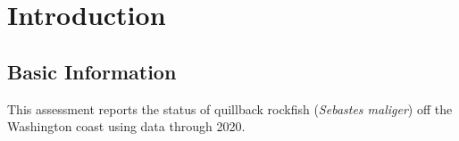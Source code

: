 \documentclass[11pt,
  english,
  a4paper,
]{article}
\begin{document}
\pagestyle{plain}  %
\renewcommand*{\thefootnote}{\arabic{footnote}}  %
\setcounter{footnote}{0}  %
\renewcommand{\headrulewidth}{0.5pt}
\renewcommand{\footrulewidth}{0.5pt}

\newcommand{\lt}{\ensuremath <}
\newcommand{\gt}{\ensuremath >}


\setcounter{page}{1}

\renewcommand{\thetable}{\roman{table}}
\renewcommand{\thefigure}{\roman{figure}}

\setlength\parskip{0.5em plus 0.1em minus 0.2em}

\vspace{500cm}

\pagebreak

\pagebreak
{}
\setcounter{page}{1}
\renewcommand{\thefigure}{\arabic{figure}}
\renewcommand{\thetable}{\arabic{table}}
\setcounter{table}{0}
\setcounter{figure}{0}


\hypertarget{introduction}{%
\section{Introduction}\label{introduction}}

\leavevmode\tagmcend\tagstructend


\hypertarget{basic-information}{%
\subsection{Basic Information}\label{basic-information}}

\leavevmode\tagmcend\tagstructend


This assessment reports the status of quillback rockfish (\emph{Sebastes maliger}) off the Washington coast using data through 2020.

\leavevmode\tagmcend\tagstructend\par
\end{document}
